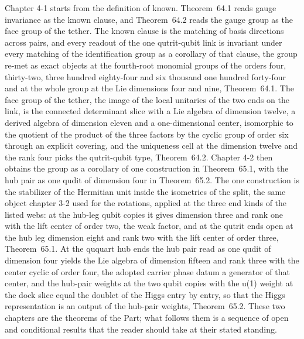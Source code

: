 Chapter 4-1 starts from the definition of known. Theorem~64.1 reads gauge invariance as the known clause, and Theorem~64.2 reads the gauge group as the face group of the tether. The known clause is the matching of basis directions across pairs, and every readout of the one qutrit-qubit link is invariant under every matching of the identification group as a corollary of that clause, the group re-met as exact objects at the fourth-root monomial groups of the orders four, thirty-two, three hundred eighty-four and six thousand one hundred forty-four and at the whole group at the Lie dimensions four and nine, Theorem~64.1. The face group of the tether, the image of the local unitaries of the two ends on the link, is the connected determinant slice with a Lie algebra of dimension twelve, a derived algebra of dimension eleven and a one-dimensional center, isomorphic to the quotient of the product of the three factors by the cyclic group of order six through an explicit covering, and the uniqueness cell at the dimension twelve and the rank four picks the qutrit-qubit type, Theorem~64.2. Chapter 4-2 then obtains the group as a corollary of one construction in Theorem~65.1, with the hub pair as one qudit of dimension four in Theorem~65.2. The one construction is the stabilizer of the Hermitian unit inside the isometries of the split, the same object chapter 3-2 used for the rotations, applied at the three end kinds of the listed webs: at the hub-leg qubit copies it gives dimension three and rank one with the lift center of order two, the weak factor, and at the qutrit ends open at the hub leg dimension eight and rank two with the lift center of order three, Theorem~65.1. At the ququart hub ends the hub pair read as one qudit of dimension four yields the Lie algebra of dimension fifteen and rank three with the center cyclic of order four, the adopted carrier phase datum a generator of that center, and the hub-pair weights at the two qubit copies with the u(1) weight at the dock slice equal the doublet of the Higgs entry by entry, so that the Higgs representation is an output of the hub-pair weights, Theorem~65.2. These two chapters are the theorems of the Part; what follows them is a sequence of open and conditional results that the reader should take at their stated standing.


